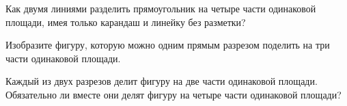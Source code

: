 ﻿
\begin{itemize}

\itA Как двумя линиями разделить прямоугольник на четыре части одинаковой площади, имея только карандаш и линейку без разметки?

\itB Изобразите фигуру, которую можно одним прямым разрезом поделить на три части одинаковой площади.

\itC Каждый из двух разрезов делит фигуру на две части одинаковой площади. Обязательно ли вместе они делят фигуру на четыре части одинаковой площади?
\end{itemize}